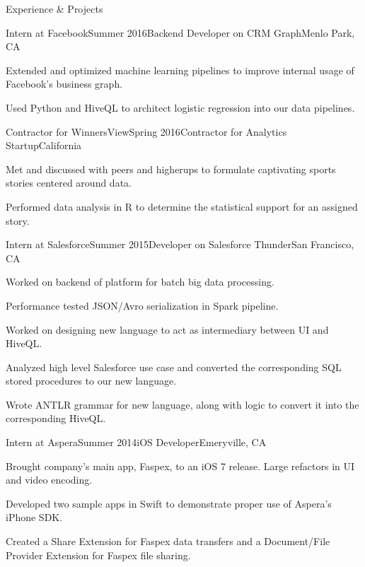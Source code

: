 \documentclass{resume} %
\begin{document}

\begin{rSection}{Experience \& Projects}

    \begin{rSubsection}{Intern at Facebook}{Summer 2016}{Backend Developer on CRM Graph}{Menlo Park, CA}
\item Extended and optimized machine learning pipelines to improve internal 
usage of Facebook's business graph.
\item Used Python and HiveQL to architect logistic regression into our data 
pipelines.
\end{rSubsection}

\begin{rSubsection}{Contractor for WinnersView}{Spring 2016}{Contractor for Analytics Startup}{California}
\item Met and discussed with peers and higherups to formulate captivating 
sports stories centered around data.
\item Performed data analysis in R to determine the statistical support for 
an assigned story.
\end{rSubsection}

\begin{rSubsection}{Intern at Salesforce}{Summer 2015}{Developer on Salesforce Thunder}{San Francisco, CA}
\item Worked on backend of platform for batch big data processing.
\item Performance tested JSON/Avro serialization in Spark pipeline.
\item Worked on designing new language to act as intermediary between UI and HiveQL.
\item Analyzed high level Salesforce use case and converted the corresponding SQL stored procedures to
    our new language.
\item Wrote ANTLR grammar for new language, along with logic to convert it into the corresponding HiveQL.
\end{rSubsection}


\begin{rSubsection}{Intern at Aspera}{Summer 2014}{iOS Developer}{Emeryville, CA}
\item Brought company's main app, Faspex, to an iOS 7 release. Large refactors in
    UI and video encoding.
\item Developed two sample apps in Swift to demonstrate proper use of Aspera's iPhone
    SDK.
\item Created a Share Extension for Faspex data transfers and a Document/File Provider Extension
    for Faspex file sharing.
\end{rSubsection}


\end{rSection}
\end{document}

